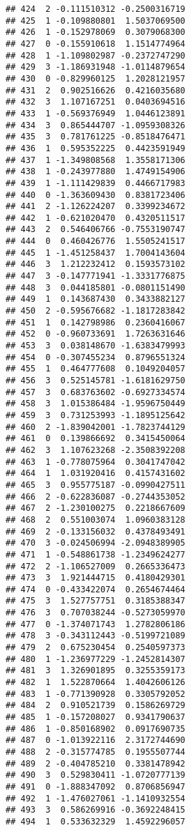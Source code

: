 \documentclass[
]{article}
\begin{document}
\begin{verbatim}
## 424  2 -0.111510312 -0.2500316719
## 425  1 -0.109880801  1.5037069500
## 426  1 -0.152978069  0.3079068300
## 427  0 -0.155910618  1.1514774964
## 428  1 -1.109802987 -0.2372747290
## 429  3 -1.186931948 -1.0114879654
## 430  0 -0.829960125  1.2028121957
## 431  2  0.902516626  0.4216035680
## 432  3  1.107167251  0.0403694516
## 433  1 -0.569376949  1.0446123891
## 434  3  0.865444707 -1.0959308326
## 435  3  0.781761225 -0.8518476471
## 436  1  0.595352225  0.4423591949
## 437  1 -1.349808568  1.3558171306
## 438  1 -0.243977880  1.4749154906
## 439  1 -1.111429839  0.4466717983
## 440  0 -1.363609430  0.8381723406
## 441  2 -1.126224207  0.3399234672
## 442  1 -0.621020470  0.4320511517
## 443  2  0.546406766 -0.7553190747
## 444  0  0.460426776  1.5505241517
## 445  1 -1.451258437  1.7004143604
## 446  3  1.212232412  0.1593573102
## 447  3 -0.147771941 -1.3331776875
## 448  3  0.044185801 -0.0801151490
## 449  1  0.143687430  0.3433882127
## 450  2 -0.595676682 -1.1817283842
## 451  1  0.142798986  0.2360416067
## 452  0 -0.960733691  1.7263631646
## 453  3  0.038148670 -1.6383479993
## 454  0 -0.307455234  0.8796551324
## 455  1  0.464777608  0.1049204057
## 456  3  0.525145781 -1.6181629750
## 457  3  0.683763602 -0.6927334574
## 458  3  1.015386484 -1.9596750449
## 459  3  0.731253993 -1.1895125642
## 460  2 -1.839042001 -1.7823744129
## 461  0  0.139866692  0.3415450064
## 462  3  1.107623268 -2.3508392208
## 463  1 -0.778075964  0.3041747042
## 464  1  1.031920416  0.4157431602
## 465  3  0.955775187 -0.0990427511
## 466  2 -0.622836087 -0.2744353052
## 467  2 -1.230100275  0.2218667609
## 468  2  0.551003074  1.0960383128
## 469  2 -0.133156032  0.4378493491
## 470  3 -0.024506994 -2.0948389905
## 471  1 -0.548861738 -1.2349624277
## 472  2 -1.106527009  0.2665336473
## 473  3  1.921444715  0.4180429301
## 474  0 -0.433422074  0.2654674464
## 475  3  1.527757751  0.3185388347
## 476  3  0.707038244 -0.5273059970
## 477  0 -1.374071743  1.2782806186
## 478  3 -0.343112443 -0.5199721089
## 479  2  0.675230454  0.2540597373
## 480  1 -1.236977229 -1.2452814307
## 481  3  1.326901895  0.3255359173
## 482  1  1.522870664  1.4042606126
## 483  1 -0.771390928  0.3305792052
## 484  2  0.910521739  0.1586269729
## 485  1 -0.157208027  0.9341790637
## 486  1 -0.850168902  0.0917690735
## 487  0 -1.013922116  2.3172744690
## 488  2 -0.315774785  0.1955507744
## 489  2 -0.404785210  0.3381478942
## 490  3  0.529830411 -1.0720777139
## 491  0 -1.888347092  0.8706856947
## 492  1 -1.476027061 -1.1410932554
## 493  3  0.586269916 -0.3692248415
## 494  1  0.533632329  1.4592296057

\end{verbatim}
\end{document}
